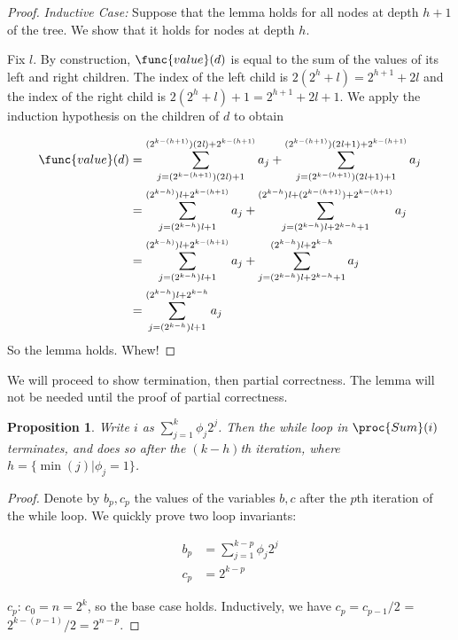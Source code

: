 \documentclass[11pt, answers]{exam}
\theoremstyle{plain}
\newtheorem{proposition}{Proposition}
\theoremstyle{definition}
\begin{document}
\begin{questions}
\begin{parts}
\begin{solution}
\begin{proof}
\emph{Inductive Case:} Suppose that the lemma holds for all nodes at depth $h + 1$ of the tree. We show that it holds for nodes at depth $h$. 

Fix $\mathit{l}$. By construction,  $\func{value}(d)$ is equal to the sum of the values of its left and right children. The index of the left child is $2(2^h + \mathit{l}) = 2^{h+1} + 2\mathit{l}$ and the index of the right child is $2(2^h + \mathit{l}) + 1 = 2^{h+1} + 2\mathit{l} + 1$. We apply the induction hypothesis on the children of $d$ to obtain

\begin{align*}
\func{value}(d) &= 
\sum_{j = (2^{k-(h+1)})(2 \mathit{l}) + 1}^{(2^{k-(h+1)})(2 \mathit{l}) + 2^{k-(h+1)}}a_j + 
\sum_{j = (2^{k-(h+1)})(2 \mathit{l} + 1) + 1}^{(2^{k-(h+1)})(2 \mathit{l} + 1) + 2^{k-(h + 1)}}a_j \\
&= \sum_{j = (2^{k-h}) \mathit{l} + 1}^{(2^{k-h)})\mathit{l} + 2^{k-(h+1)}}a_j + 
\sum_{j = (2^{k-h})\mathit{l} + 2^{k-h} + 1}^{(2^{k-h}) \mathit{l} + (2^{k-(h + 1)}) + 2^{k-(h + 1)}}a_j \\
&= \sum_{j = (2^{k-h}) \mathit{l} + 1}^{(2^{k-h)})\mathit{l} + 2^{k-(h+1)}}a_j + 
\sum_{j = (2^{k-h})\mathit{l} + 2^{k-h} + 1}^{(2^{k-h}) \mathit{l} + 2^{k-h}}a_j \\
&= \sum_{j = (2^{k-h})\mathit{l} + 1}^{(2^{k-h})\mathit{l} + 2^{k-h}}a_j
\end{align*}
So the lemma holds. Whew!
\end{proof}

We will proceed to show termination, then partial correctness. The lemma will not be needed until the proof of partial correctness.

\begin{proposition}
Write $i$ as $\sum_{j = 1}^{k}\phi_j 2^j$. Then the while loop in $\proc{Sum}(i)$ terminates, and does so after the $(k-h)$th iteration, where $h = \{\min(j) | \phi_j = 1\}$. 
\end{proposition}

\begin{proof}
Denote by $b_p, c_p$ the values of the variables $b,c$ after the $p$th iteration of the while loop. We quickly prove two loop invariants:

\begin{align*}
b_p &=  \sum_{j = 1}^{k-p}\phi_j 2^j \\
c_p &=  2^{k-p}
\end{align*}

$c_p$: $c_0 = n = 2^k$, so the base case holds. Inductively, we have $c_p = c_{p-1} / 2$ = $2^{k-(p-1)} / 2 = 2^{n-p}$.


\end{proof}
\end{solution}
\end{parts}
\end{questions}
\end{document}
